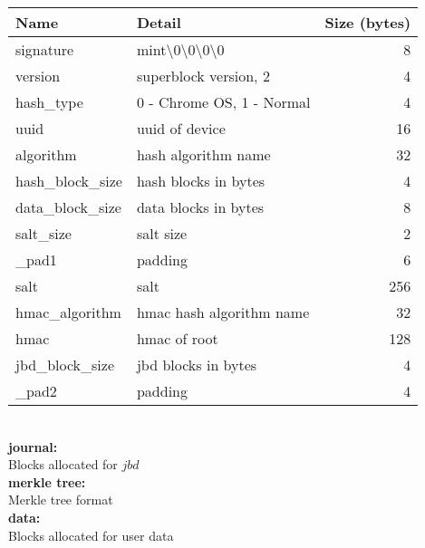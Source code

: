 \documentclass[letter,12pt,portrait]{article}
\begin{document}
\begin{tabular}{|l|l|r|}
    \hline
    \textbf{Name} & \textbf{Detail} & \textbf{Size (bytes)} \\ \hline
    signature & mint\textbackslash0\textbackslash0\textbackslash0\textbackslash0  & 8\\ \hline
    version & superblock version, 2 & 4\\ \hline
    hash\_type & 0 - Chrome OS, 1 - Normal & 4\\ \hline
    uuid & uuid of device & 16 \\ \hline
    algorithm & hash algorithm name & 32\\ \hline
    hash\_block\_size  & hash blocks in bytes & 4\\ \hline
    data\_block\_size & data blocks in bytes & 8\\ \hline
    salt\_size & salt size & 2\\ \hline
    \_pad1 & padding & 6 \\ \hline
    salt & salt & 256 \\ \hline
    hmac\_algorithm & hmac hash algorithm name & 32 \\ \hline
    hmac & hmac of root & 128 \\ \hline
    jbd\_block\_size & jbd blocks in bytes & 4 \\ \hline
    \_pad2 & padding & 4 \\ \hline
\end{tabular}
\\
\textbf{journal:}\\
Blocks allocated for $jbd$\\
\textbf{merkle tree:}\\
Merkle tree format\\
\textbf{data:}\\
Blocks allocated for user data\\

\end{document}
